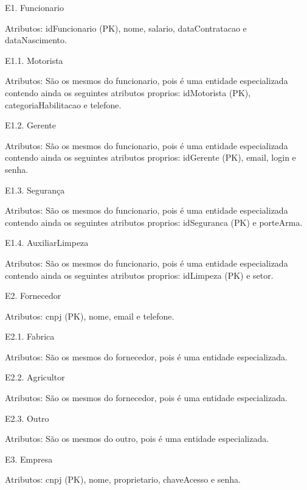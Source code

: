 \documentclass[12pt, onecolumn, titlepage]{article}
\begin{document}
\begin{description}

\item E1. Funcionario
\item \qquad Atributos: idFuncionario (PK), nome, salario, dataContratacao e dataNascimento.

\item E1.1. Motorista
\item \qquad Atributos: São os mesmos do funcionario, pois é uma entidade especializada contendo ainda os seguintes atributos proprios: idMotorista (PK), categoriaHabilitacao e telefone.

\item E1.2. Gerente
\item \qquad Atributos: São os mesmos do funcionario, pois é uma entidade especializada contendo ainda os seguintes atributos proprios: idGerente (PK), email, login e senha.

\item E1.3. Segurança
\item \qquad Atributos: São os mesmos do funcionario, pois é uma entidade especializada contendo ainda os seguintes atributos proprios: idSeguranca (PK) e porteArma.

\item E1.4. AuxiliarLimpeza
\item \qquad Atributos: São os mesmos do funcionario, pois é uma entidade especializada contendo ainda os seguintes atributos proprios: idLimpeza (PK) e setor.

\item E2. Fornecedor
\item \qquad Atributos: cnpj (PK), nome, email e telefone.

\item E2.1. Fabrica
\item \qquad Atributos: São os mesmos do fornecedor, pois é uma entidade especializada.

\item E2.2. Agricultor
\item \qquad Atributos: São os mesmos do fornecedor, pois é uma entidade especializada.

\item E2.3. Outro
\item \qquad Atributos: São os mesmos do outro, pois é uma entidade especializada.

\item E3. Empresa
\item \qquad Atributos: cnpj (PK), nome, proprietario, chaveAcesso e senha.


\end{description}
\end{document}
